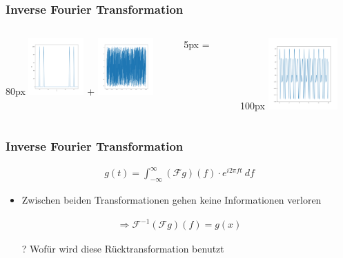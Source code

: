 
\begin{frame}
    \frametitle{Inverse Fourier Transformation}
    \begin{columns}
        \begin{column}{80px}
            \includegraphics[width=80px, caption=Magnitude]{images/03-ift-mag.png} 
            \centering
            +
            \includegraphics[width=80px]{images/03-ift-phase.png}
        \end{column}
        \hspace*{-40px}
        \begin{column}{5px}
            =
        \end{column}
        \hspace*{-40px}
        \begin{column}{100px}
            \includegraphics[width=100px]{images/03-ift-reconstructed.png} 
        \end{column}

    \end{columns}
\end{frame}

\begin{frame}
    \frametitle{Inverse Fourier Transformation}
    \begin{align*}
        g(t)=\int_{-\infty}^{\infty}{(\mathcal F g)(f)\cdot  e^{i2\pi f t}\ df}
    \end{align*} 
    \begin{itemize}
        \item Zwischen beiden Transformationen gehen keine Informationen verloren
    \end{itemize}
    \begin{align*}
        \Rightarrow \mathcal{F}^{-1}(\mathcal F g)(f)=g(x)
    \end{align*}
    \vspace*{-15px}
    \begin{itemize}
        \item[?] Wofür wird diese Rücktransformation benutzt
    \end{itemize}
\end{frame}

